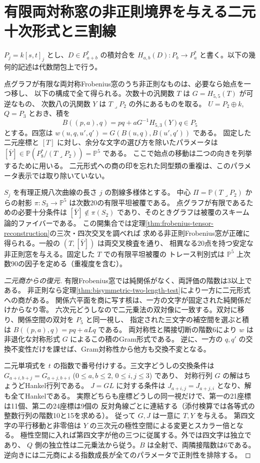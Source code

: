 \section{有限両対称窓の非正則境界を与える二元十次形式と三割線}
\label{sec:binary-secant-obstructions}
$P_j=k[s,t]_j$ とし、$D\in P_{a+b}^*$ の積対合を
$H_{a,b}(D):P_b\to P_a^*$ と書く。以下の幾何的記述は代数閉包上で行う。
\begin{theorem}\label{thm:binary-secant-obstructions}
点グラフが有限な両対称Frobenius窓のうち非正則なものは、必要なら始点を一つ移し、
以下の構成で全て得られる。次数十の汎関数 $T$ は $G=H_{5,5}(T)$ が可逆なもの、
次数八の汎関数 $Y$ は $T\mathbin{\lrcorner}P_2$ の外にあるものを取る。
$U=P_2\oplus k$, $Q=P_3$ とおき、積を
\[
 B((p,a),q)=pq+aG^{-1}H_{5,3}(Y)q\in P_5
\]
とする。四窓は $w(u,q,u',q')=G(B(u,q),B(u',q'))$ である。
固定した二元座標と $[T]$ に対し、余分な文字の選び方を除いたパラメータは
$[\bar Y]\in\mathbb P(P_8^*/(T\mathbin{\lrcorner}P_2))=\mathbb P^5$ である。
ここで始点の移動は二つの向きを列挙するために用いる。
二元形式への商の印を忘れた同型類の重複は、このパラメータ表示では取り除いていない。

$S_j$ を有理正規八次曲線の長さ $j$ の割線多様体とする。
中心 $\Pi=\mathbb P(T\mathbin{\lrcorner}P_2)$ からの射影
$\pi:S_3\to\mathbb P^5$ は次数20の有限平坦被覆である。
点グラフが有限であるための必要十分条件は
$[\bar Y]\notin\pi(S_2)$ であり、そのときグラフは被覆のスキーム論的ファイバーである。
この開集合では定理\ref{thm:frobenius-tensor-reconstruction}の三次・四次交叉を調べれば
求める非正則Frobenius窓が正確に得られる。一般の $(T,[\bar Y])$ は両交叉検査を通り、
相異なる20点を持つ安定な非正則窓を与える。固定した $T$ での有限平坦被覆の
トレース判別式は $\mathbb P^5$ 上次数90の因子を定める（重複度を含む）。
\end{theorem}
\begin{proof}[二元商からの復元]
有限Frobenius窓では純関係がなく、両評価の階数は3以上である。
非正則なら定理\ref{thm:bisymmetric-two-length-test}により一方に二元形式への商がある。
関係六平面を商に写す核は、一方の文字が固定された純関係だけからなり零。
六次元どうしなので二元乗法の双対像に一致する。双対に移り、関係空間の双対を $P_5$ と同一視し、
指定された三文字の補空間を選ぶと積は $B((p,a),q)=pq+aLq$ である。
両対称性と隣接切断の階数6により $w$ は非退化な対称形式 $G$ によるこの積のGram形式である。
逆に、一方の $q,q'$ の交換不変性だけを課せば、Gram対称性から他方も交換不変となる。

二元単項式を $t$ の指数で番号付けする。三文字どうしの交換条件は
$G_{a+i,b+j}=G_{a+j,b+i}$ ($0\le a,b\le2$, $0\le i,j\le3$) であり、
対称行列 $G$ の解はちょうどHankel行列である。
$J=GL$ に対する条件は $J_{a+i,j}=J_{a+j,i}$ となり、解も全てHankelである。
実際どちらも座標どうしの同一視だけで、第一の21座標は11個、第二の24座標は9個の
反対角線ごとに連結する（添付検算では各等式の整数行列の階数10と15を求める）。
従って $G,J$ は一意に $T,Y$ を与える。
第四文字の平行移動と非零倍は $Y$ の三次元の極性空間による変更とスカラー倍となる。
極性空間に入れば第四文字が他の三つに従属する。外では四文字は独立であり、
$Q$ 側の独立性は二元乗法から従う。$B$ は全射で、両隣接階数は6である。
逆向きには二元商による指数成長が全てのパラメータで正則性を排除する。
\end{proof}
